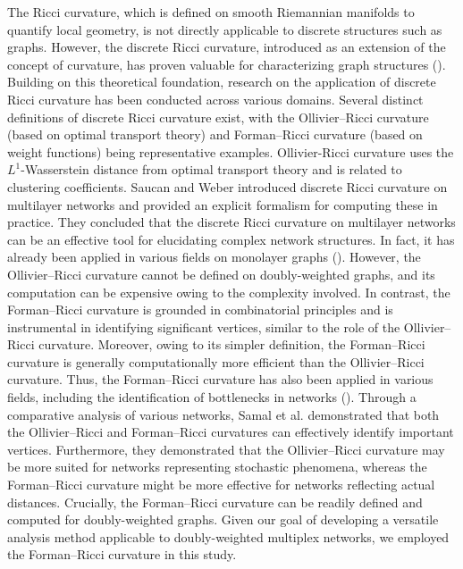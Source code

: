 \documentclass[preprint,12pt,number]{elsarticle}
\theoremstyle{plain} %
\theoremstyle{definition} %
\begin{document}
The Ricci curvature, which is defined on smooth Riemannian manifolds to quantify local geometry, is not directly applicable to discrete structures such as graphs. However, the discrete Ricci curvature, introduced as an extension of the concept of curvature, has proven valuable for characterizing graph structures (\cite{forman2003bochner, JL, LLY}). Building on this theoretical foundation, research on the application of discrete Ricci curvature has been conducted across various domains.
Several distinct definitions of discrete Ricci curvature exist, with the Ollivier--Ricci curvature (based on optimal transport theory) and Forman--Ricci curvature (based on weight functions) being representative examples.
Ollivier-Ricci curvature uses the $L^1$-Wasserstein distance from optimal transport theory and is related to clustering coefficients.
Saucan and Weber \cite{Saucan} introduced discrete Ricci curvature on multilayer networks and provided an explicit formalism for computing these in practice. They concluded that the discrete Ricci curvature on multilayer networks can be an effective tool for elucidating complex network structures. 
In fact, it has already been applied in various fields on monolayer graphs (\cite{coupette2023ollivierricci,gosztolai2021unfolding,ni2015ricci}).
However, the Ollivier--Ricci curvature cannot be defined on doubly-weighted graphs, and its computation can be expensive owing to the complexity involved.
In contrast, the Forman--Ricci curvature is grounded in combinatorial principles and is instrumental in identifying significant vertices, similar to the role of the Ollivier--Ricci curvature. Moreover, owing to its simpler definition, the Forman--Ricci curvature is generally computationally more efficient than the Ollivier--Ricci curvature.
Thus, the Forman--Ricci curvature has also been applied in various fields,  including the identification of bottlenecks in networks (\cite{de2021using, tee2021enhanced}).
Through a comparative analysis of various networks, Samal et al. \cite{samal2018comparative} demonstrated that both the Ollivier--Ricci and Forman--Ricci curvatures can effectively identify important vertices. Furthermore, they demonstrated that the Ollivier--Ricci curvature may be more suited for networks representing stochastic phenomena, whereas the Forman--Ricci curvature might be more effective for networks reflecting actual distances.  Crucially, the Forman--Ricci curvature can be readily defined and computed for doubly-weighted graphs. Given our goal of developing a versatile analysis method applicable to doubly-weighted multiplex networks, we employed the Forman--Ricci curvature in this study. 
\end{document}

